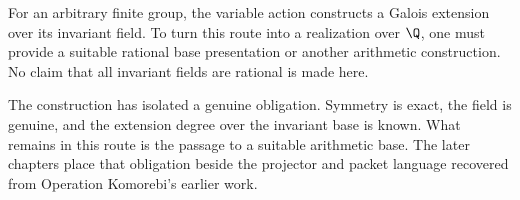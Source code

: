 \begin{openproblem}
For an arbitrary finite group, the variable action constructs a Galois extension over its invariant field. To turn this route into a realization over $\Q$, one must provide a suitable rational base presentation or another arithmetic construction. No claim that all invariant fields are rational is made here.
\end{openproblem}

The construction has isolated a genuine obligation. Symmetry is exact, the field is genuine, and the extension degree over the invariant base is known. What remains in this route is the passage to a suitable arithmetic base. The later chapters place that obligation beside the projector and packet language recovered from Operation Komorebi's earlier work.
